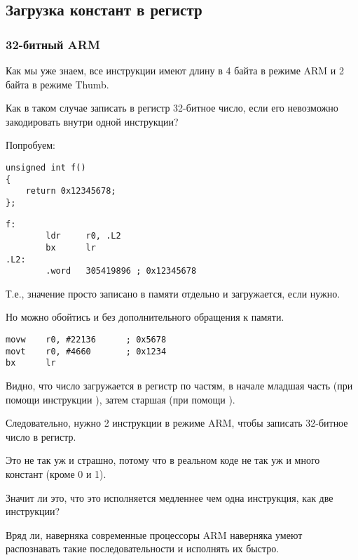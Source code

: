 ﻿\subsection{Загрузка констант в регистр}
\label{ARM_big_constants}

\subsubsection{32-битный ARM}
\label{ARM_big_constants_loading}

Как мы уже знаем, все инструкции имеют длину в 4 байта в режиме ARM и 2 байта в режиме Thumb.

Как в таком случае записать в регистр 32-битное число, если его невозможно закодировать
внутри одной инструкции?

Попробуем:

\begin{lstlisting}
unsigned int f()
{
	return 0x12345678;
};
\end{lstlisting}

\begin{lstlisting}[caption=GCC 4.6.3 -O3 \ARMMode]
f:
        ldr     r0, .L2
        bx      lr
.L2:
        .word   305419896 ; 0x12345678
\end{lstlisting}

Т.е., значение  просто записано в памяти отдельно и загружается, если нужно.

Но можно обойтись и без дополнительного обращения к памяти.

\begin{lstlisting}[caption=GCC 4.6.3 -O3 -march{=}armv7-a (\ARMMode)]
movw    r0, #22136      ; 0x5678
movt    r0, #4660       ; 0x1234
bx      lr
\end{lstlisting}

Видно, что число загружается в регистр по частям, в начале младшая часть 
(при помощи инструкции ), затем старшая (при помощи ).

Следовательно, нужно 2 инструкции в режиме ARM, чтобы записать 32-битное число в регистр.

Это не так уж и страшно, потому что в реальном коде не так уж и много констант (кроме 0 и 1).

Значит ли это, что это исполняется медленнее чем одна инструкция, как две инструкции?

Вряд ли, наверняка современные процессоры ARM наверняка умеют распознавать такие 
последовательности и исполнять их быстро.

